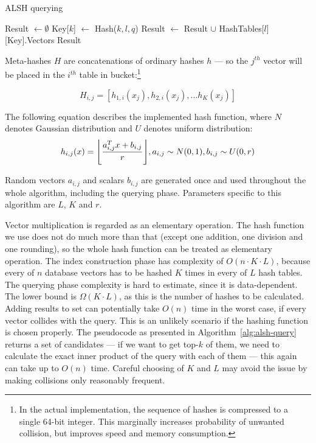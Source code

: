 \begin{algorithm}
	\caption{ALSH querying}
	\begin{algorithmic}
		\State Result $\gets \emptyset$
				\State Key[$k$] $\gets$ Hash($k, l, q$)
			\EndFor
			\State Result $\gets$ Result $\cup$ HashTables[$l$][Key].Vectors
		\EndFor
		\State \Return Result
	\end{algorithmic}
\label{alg:alsh-query}
\end{algorithm}

Meta-hashes $H$ are concatenations of ordinary hashes $h$ --- so the $j^{th}$ vector will be placed in 
the $i^{th}$ table in bucket:\footnote{
In the actual implementation, the sequence of hashes is compressed to a single 64-bit integer. This
marginally increases probability of unwanted collision, but improves speed and memory consumption.
}

$$H_{i,j} = [h_{1,i}(x_j), h_{2,i}(x_j), \dots h_K(x_j)]$$

The following equation describes the implemented hash function, where
$N$ denotes Gaussian distribution and $U$ denotes uniform distribution:
\begin{equation*}
h_{i,j}(x) = \floor*{\frac{a_{i,j}^T x + b_{i,j}}{r}}, a_{i,j} \sim N(0,1), b_{i,j} \sim U(0,r)
\end{equation*}
\par
Random vectors $a_{i,j}$ and scalars $b_{i,j}$ are generated once and used throughout the whole
algorithm, including the querying phase. Parameters specific to this algorithm are $L$, $K$ and $r$.

Vector multiplication is regarded as an elementary operation.
The hash function we use does not do much more than that (except one addition,
one division and one rounding),
so the whole hash function can be treated as elementary operation.
The index construction phase has complexity of $O(n \cdot K \cdot L)$,
because every of $n$ database vectors
has to be hashed $K$ times in every of $L$ hash tables.
The querying phase complexity is hard to estimate, since it is data-dependent.
The lower bound is $\Omega(K \cdot L)$, as this is the number of hashes to be
calculated. Adding results to set can potentially take $O(n)$ time in the worst
case, if every vector collides with the query. This is an unlikely scenario if
the hashing function is chosen properly. The pseudocode as presented in Algorithm~\ref{alg:alsh-query} returns a set
of candidates --- if we want to get top-$k$ of them, we need to calculate the exact
inner product of the query with each of them --- this again can take up to
$O(n)$ time. Careful choosing of $K$ and $L$ may avoid the issue
by making collisions only reasonably frequent.


